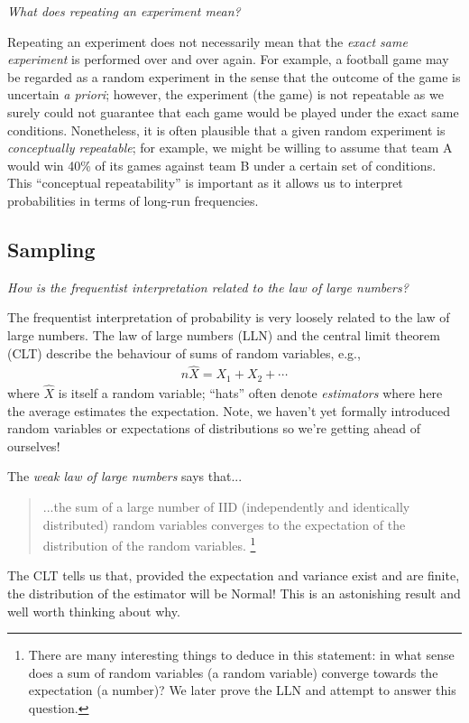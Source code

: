 \emph{What does repeating an experiment mean?}

Repeating an experiment does not necessarily mean 
that the \emph{exact same experiment} is performed over and over
again. 
For example, 
a football game may be regarded as a random experiment in 
the sense that the outcome of the game is uncertain \emph{a priori}; 
however, 
the experiment (the game) is not repeatable as
we surely could not guarantee that each game would be played
under the exact same conditions. 
Nonetheless, 
it is often plausible that a given random experiment 
is \emph{conceptually repeatable}; 
for example,
we might be willing to assume that team A would win 40\% of
its games against team B under a certain set of conditions. 
This ``conceptual repeatability'' is important as it allows us to interpret
probabilities in terms of long-run frequencies.

\subsection{Sampling}

\emph{How is the frequentist interpretation related to the law of large numbers?}

The frequentist interpretation of probability is very loosely related to the law of large numbers.
The law of large numbers (LLN)
and the central limit theorem (CLT) describe the behaviour of sums of random variables, e.g.,
\begin{align}
n\widehat{X} = X_{1} + X_{2} + \cdots
\end{align}
where \(\widehat{X}\) is itself a random variable; 
``hats'' often denote \emph{estimators} where here the average estimates the expectation. 
Note, we haven't yet formally introduced random variables or 
expectations of distributions so we're getting ahead of ourselves!

The \emph{weak law of large numbers} says that...

\begin{quote}
...the sum of a large number of IID
(independently and identically distributed) random variables
converges to the expectation of the distribution
of the random variables.%
\footnote{
There are many interesting things to deduce in this statement: 
in what sense does a sum of random variables (a random variable) converge
towards the expectation (a number)?
We later prove the LLN and attempt to answer this question. 
}
\end{quote}

The CLT tells us that, 
provided the expectation and variance exist and are finite, 
the distribution of the estimator will be Normal! 
This is an astonishing result and well worth thinking about why.

